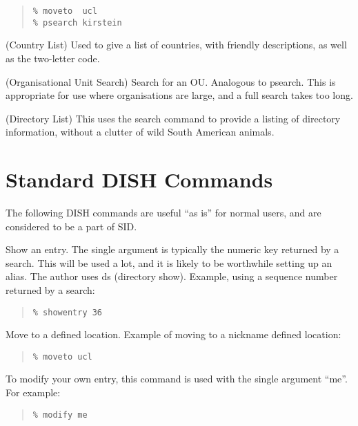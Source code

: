 \begin{describe}
\begin{enumerate}
\begin{quote}\begin{verbatim}
% moveto  ucl
% psearch kirstein
\end{verbatim}\end{quote}

\end{enumerate}



\item[\verb+clist+:] (Country List) Used to give a list of countries, with friendly descriptions,
as well as the two-letter code.

\item[\verb+ousearch+:] (Organisational Unit Search) Search for an OU.  Analogous to psearch.  This is
appropriate for use where organisations are large, and a full search takes
too long.

\item[\verb+dlist+:] (Directory List) This uses the search command to provide a listing of directory
information, without a clutter of wild South American animals.

\end{describe}

\section {Standard DISH Commands}

The following DISH commands are useful ``as is'' for normal users, and are
considered to be a part of SID.

\begin{describe}
\item[\verb+showentry+:] Show an entry.  The single argument is typically the numeric
key returned by a search.  This will be used a lot, and it is likely to be
worthwhile setting up an alias.  The author uses ds (directory show).
Example, using a sequence number returned by a search:

\begin{quote}\begin{verbatim}
% showentry 36
\end{verbatim}\end{quote}


\item[\verb+moveto+:] Move to a defined location.  Example of moving to a nickname
defined location:

\begin{quote}\begin{verbatim}
% moveto ucl
\end{verbatim}\end{quote}


\item[\verb+modify+:] To modify your own entry, this command is used with the single
argument ``me''.  For example:
\begin{quote}\begin{verbatim}
% modify me
\end{verbatim}\end{quote}

\end{describe}


